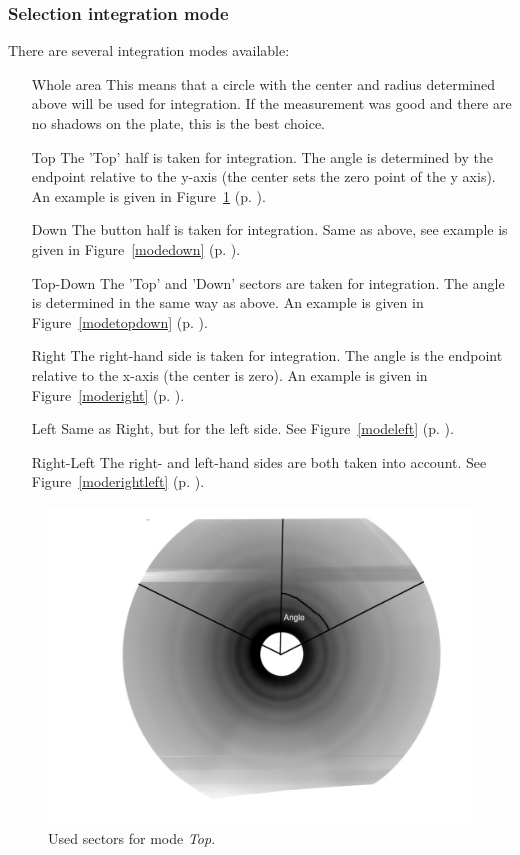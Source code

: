 \subsubsection{Selection integration mode}
There are several integration modes available: 
\begin{itemize}
\item [Whole area] This means that a circle with the center and radius determined above will be used for integration. If the measurement was good and there are no shadows on the plate, this is the best choice. 
\item[Top] The 'Top' half is taken for integration. The angle is determined by the endpoint relative to the y-axis (the center sets the zero point of the y axis). An example is given in Figure~\ref{modetop} (p. \pageref{modetop}).
\item [Down] The button half is taken for integration. Same as above, see example is given in Figure~\ref{modedown} (p. \pageref{modedown}).
\item [Top-Down] The 'Top' and 'Down' sectors are taken for integration. The angle is determined in the same way as above. An example is given in Figure~\ref{modetopdown} (p. \pageref{modetopdown}).
\item [Right]The right-hand side is taken for integration. The angle is the endpoint relative to the x-axis (the center is zero). An example is given in  Figure~\ref{moderight} (p. \pageref{moderight}).
\item [Left] Same as Right, but for the left side. See Figure~\ref{modeleft} (p. \pageref{modeleft}).
\item [Right-Left] The right- and left-hand sides are both taken into account. See Figure~\ref{moderightleft} (p. \pageref{moderightleft}).
\end{itemize}

\begin{figure}
\includegraphics[width=12cm]{top.jpg}
\caption{Used sectors for mode \textit{Top}. }
\label{modetop} 
\end{figure} 

